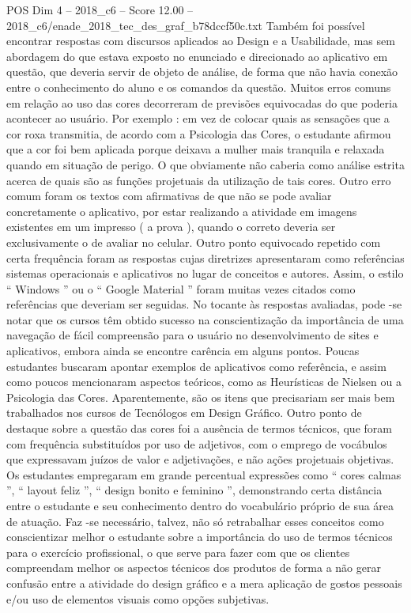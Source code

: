 \begin{textsample}{POS Dim 4 – 2018\_c6 – Score 12.00 – 2018\_c6/enade\_2018\_tec\_des\_graf\_b78dccf50c.txt}
Também foi possível encontrar respostas com discursos aplicados ao Design e a Usabilidade, mas sem abordagem do que estava exposto no enunciado e direcionado ao aplicativo em questão, que deveria servir de objeto de análise, de forma que não havia conexão entre o conhecimento do aluno e os comandos da questão.
Muitos erros comuns em relação ao uso das cores decorreram de previsões equivocadas do que poderia acontecer ao usuário.
Por exemplo : em vez de colocar quais as sensações que a cor roxa transmitia, de acordo com a Psicologia das Cores, o estudante afirmou que a cor foi bem aplicada porque deixava a mulher mais tranquila e relaxada quando em situação de perigo.
O que obviamente não caberia como análise estrita acerca de quais são as funções projetuais da utilização de tais cores.
Outro erro comum foram os textos com afirmativas de que não se pode avaliar concretamente o aplicativo, por estar realizando a atividade em imagens existentes em um impresso ( a prova ), quando o correto deveria ser exclusivamente o de avaliar no celular.
Outro ponto equivocado repetido com certa frequência foram as respostas cujas diretrizes apresentaram como referências sistemas operacionais e aplicativos no lugar de conceitos e autores.
Assim, o estilo “ Windows ” ou o “ Google Material ” foram muitas vezes citados como referências que deveriam ser seguidas.
No tocante às respostas avaliadas, pode -se notar que os cursos têm obtido sucesso na conscientização da importância de uma navegação de fácil compreensão para o usuário no desenvolvimento de sites e aplicativos, embora ainda se encontre carência em alguns pontos.
Poucas estudantes buscaram apontar exemplos de aplicativos como referência, e assim como poucos mencionaram aspectos teóricos, como as Heurísticas de Nielsen ou a Psicologia das Cores.
Aparentemente, são os itens que precisariam ser mais bem trabalhados nos cursos de Tecnólogos em Design Gráfico.
Outro ponto de destaque sobre a questão das cores foi a ausência de termos técnicos, que foram com frequência substituídos por uso de adjetivos, com o emprego de vocábulos que expressavam juízos de valor e adjetivações, e não ações projetuais objetivas.
Os estudantes empregaram em grande percentual expressões como “ cores calmas ”, “ layout feliz ”, “ design bonito e feminino ”, demonstrando certa distância entre o estudante e seu conhecimento dentro do vocabulário próprio de sua área de atuação.
Faz -se necessário, talvez, não só retrabalhar esses conceitos como conscientizar melhor o estudante sobre a importância do uso de termos técnicos para o exercício profissional, o que serve para fazer com que os clientes compreendam melhor os aspectos técnicos dos produtos de forma a não gerar confusão entre a atividade do design gráfico e a mera aplicação de gostos pessoais e/ou uso de elementos visuais como opções subjetivas.

\end{textsample}
